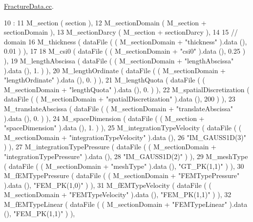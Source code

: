 \hyperlink{FractureData_8cc}{Fracture\-Data.\-cc}. 


\begin{DoxyCode}
10                                                              :
11             M\_section ( section ),
12             M\_sectionDomain ( M\_section + sectionDomain ),
13             M\_sectionDarcy ( M\_section + sectionDarcy ),
14 
15             \textcolor{comment}{// domain}
16             M\_thickness ( dataFile ( ( M\_sectionDomain + \textcolor{stringliteral}{"thickness"} ).data (), 0.01 ) ),
17 
18             M\_csi0 ( dataFile ( ( M\_sectionDomain + \textcolor{stringliteral}{"csi0"} ).data (), 0.25 ) ),
19             M\_lengthAbscissa ( dataFile ( ( M\_sectionDomain + \textcolor{stringliteral}{"lengthAbscissa"} ).data (), 1. ) ),
20             M\_lengthOrdinate ( dataFile ( ( M\_sectionDomain + \textcolor{stringliteral}{"lengthOrdinate"} ).data (), 0. ) ),
21             M\_lengthQuota ( dataFile ( ( M\_sectionDomain + \textcolor{stringliteral}{"lengthQuota"} ).data (), 0. ) ),
22             M\_spatialDiscretization ( dataFile ( ( M\_sectionDomain + \textcolor{stringliteral}{"spatialDiscretization"} ).data (), 200
       ) ),
23             M\_translateAbscissa ( dataFile ( ( M\_sectionDomain + \textcolor{stringliteral}{"translateAbscissa"} ).data (), 0. ) ),
24             M\_spaceDimension ( dataFile ( ( M\_section + \textcolor{stringliteral}{"spaceDimension"} ).data (), 1. ) ),
25             M\_integrationTypeVelocity ( dataFile ( ( M\_sectionDomain + \textcolor{stringliteral}{"integrationTypeVelocity"} ).data (),
26                                                    \textcolor{stringliteral}{"IM\_GAUSS1D(3)"} ) ),
27             M\_integrationTypePressure ( dataFile ( ( M\_sectionDomain + \textcolor{stringliteral}{"integrationTypePressure"} ).data (),
28                                                    \textcolor{stringliteral}{"IM\_GAUSS1D(2)"} ) ),
29             M\_meshType ( dataFile ( ( M\_sectionDomain + \textcolor{stringliteral}{"meshType"} ).data (), \textcolor{stringliteral}{"GT\_PK(1,1)"} ) ),
30             M\_fEMTypePressure ( dataFile ( ( M\_sectionDomain + \textcolor{stringliteral}{"FEMTypePressure"} ).data (), \textcolor{stringliteral}{"FEM\_PK(1,0)"} )
       ),
31             M\_fEMTypeVelocity ( dataFile ( ( M\_sectionDomain + \textcolor{stringliteral}{"FEMTypeVelocity"} ).data (), \textcolor{stringliteral}{"FEM\_PK(1,1)"} )
       ),
32             M\_fEMTypeLinear ( dataFile ( ( M\_sectionDomain + \textcolor{stringliteral}{"FEMTypeLinear"} ).data (), \textcolor{stringliteral}{"FEM\_PK(1,1)"} ) ),

\end{DoxyCode}
